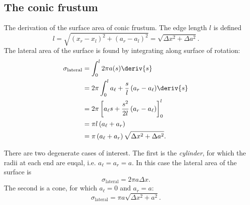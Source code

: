 \subsection{The conic frustum}
The derivation of the surface area of conic frustum.
The edge length $l$ is defined
\begin{equation}
    l = \sqrt{(x_r - x_l)^2 + (a_r - a_l)^2} = \sqrt{\Delta x^2 + \Delta a^2}.
\end{equation}
The lateral area of the surface is found by integrating along surface of rotation:
\begin{align}
    \sigma_{\text{lateral}}
        &= \int_{0}^{l} {2\pi a(s)} \deriv{s} \nonumber \\
        &= 2\pi \int_{0}^{l} {a_{\ell} + \frac{s}{l}\left( a_r - a_\ell \right)} \deriv{s} \nonumber \\
        &= 2\pi \left[ a_{\ell}s + \frac{s^2}{2l}\left( a_r - a_\ell \right) \right]_0^l \nonumber \\
        &= \pi l \left( a_{\ell} + a_r \right) \nonumber \\
        &= \pi \left( a_{\ell} + a_r \right) \sqrt{\Delta x^2 + \Delta a^2}. \label{eq:frustum_area}
\end{align}

There are two degenerate cases of interest. The first is the \emph{cylinder}, for which the radii at each end are euqal, i.e. $a_\ell = a_r = a$. In this case the lateral area of the surface is
\begin{equation}
    \sigma_{\text{lateral}} = 2\pi a \Delta x.
\end{equation}
The second is a cone, for which $a_\ell=0$ and $a_r=a$:
\begin{equation}
    \sigma_{\text{lateral}} = \pi a \sqrt{\Delta x^2 + a^2}.
\end{equation}
